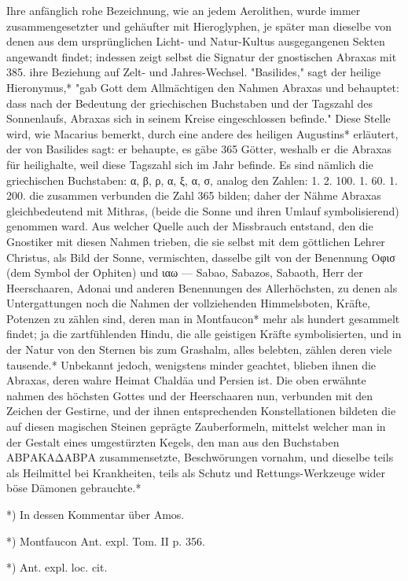 \documentclass[a4paper, 11pt, oneside, polutonikogreek, german]{article}
\begin{document}
Ihre anfänglich rohe Bezeichnung, wie an jedem Aerolithen, wurde immer zusammengesetzter und gehäufter mit Hieroglyphen, je später man dieselbe von denen aus dem ursprünglichen Licht- und Natur-Kultus ausgegangenen Sekten angewandt findet; indessen zeigt selbst die Signatur der gnostischen Abraxas mit 385. ihre Beziehung auf Zelt- und Jahres-Wechsel. "Basilides," sagt der heilige Hieronymus,* "gab Gott dem Allmächtigen den Nahmen Abraxas und behauptet: dass nach der Bedeutung der griechischen Buchstaben und der Tagszahl des Sonnenlaufs, Abraxas sich in seinem Kreise eingeschlossen befinde." Diese Stelle wird, wie Macarius bemerkt, durch eine andere des heiligen Augustins* erläutert, der von Basilides sagt: er behaupte, es gäbe 365 Götter, weshalb er die Abraxas für heilighalte, weil diese Tagszahl sich im Jahr befinde. Es sind nämlich die griechischen Buchstaben: α, β, ρ, α, ξ, α, σ, analog den Zahlen: 1. 2. 100. 1. 60. 1. 200. die zusammen verbunden die Zahl 365 bilden; daher der Nähme Abraxas gleichbedeutend mit Mithras, (beide die Sonne und ihren Umlauf symbolisierend) genommen ward. Aus welcher Quelle auch der Missbrauch entstand, den die Gnostiker mit diesen Nahmen trieben, die sie selbst mit dem göttlichen Lehrer Christus, als Bild der Sonne, vermischten, dasselbe gilt von der Benennung Οφισ (dem Symbol der Ophiten) und ιαω --- Sabao, Sabazos, Sabaoth, Herr der Heerschaaren, Adonai und anderen Benennungen des Allerhöchsten, zu denen als Untergattungen noch die Nahmen der vollziehenden Himmelsboten, Kräfte, Potenzen zu zählen sind, deren man in Montfaucon* mehr als hundert gesammelt findet; ja die zartfühlenden Hindu, die alle geistigen Kräfte symbolisierten, und in der Natur von den Sternen bis zum Grashalm, alles belebten, zählen deren viele tausende.* Unbekannt jedoch, wenigstens minder geachtet, blieben ihnen die Abraxas, deren wahre Heimat Chaldäa und Persien ist. Die oben erwähnte nahmen des höchsten Gottes und der Heerschaaren nun, verbunden mit den Zeichen der Gestirne, und der ihnen entsprechenden Konstellationen bildeten die auf diesen magischen Steinen geprägte Zauberformeln, mittelst welcher man in der Gestalt eines umgestürzten Kegels, den man aus den Buchstaben ΑΒΡΑΚΑΔΑΒΡΑ zusammensetzte, Beschwörungen vornahm, und dieselbe teils als Heilmittel bei Krankheiten, teils als Schutz und Rettungs-Werkzeuge wider böse Dämonen gebrauchte.*

*) In dessen Kommentar über Amos.

*) Montfaucon Ant. expl. Tom. II p. 356.

*) Ant. expl. loc. cit.
\end{document}
